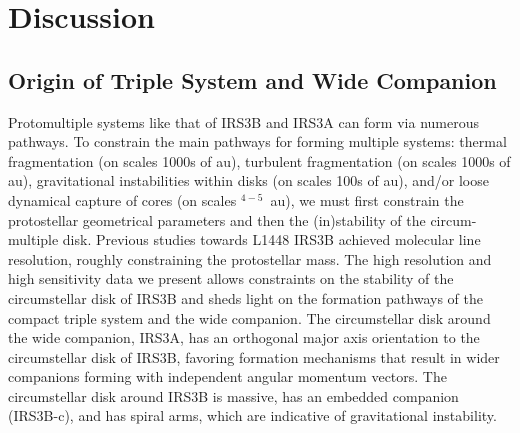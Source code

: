 \documentclass[twocolumn, 12pt, trackchanges]{aastex63}
\begin{document}
\section{Discussion}\label{sec:discussion}

\subsection{Origin of Triple System and Wide Companion}\label{sec:origin}
Protomultiple systems like that of IRS3B and IRS3A can form via numerous pathways. To constrain the main pathways for forming multiple systems: thermal fragmentation (on scales \ab1000s of au), turbulent fragmentation (on scales \ab1000s of au), gravitational instabilities within disks (on scales \ab100s of au), and/or loose dynamical capture of cores (on scales $^{4-5}$~au), we must first constrain the protostellar geometrical parameters and then the (in)stability of the circum-multiple disk. Previous studies towards L1448 IRS3B \citep[see ][]{2016Natur.538..483T} achieved \space molecular line resolution, roughly constraining the protostellar mass. The high resolution and high sensitivity data we present allows constraints on the stability of the circumstellar disk of IRS3B and sheds light on the formation pathways of the compact triple system and the wide companion. The circumstellar disk around the wide companion, IRS3A, has an orthogonal major axis orientation to the circumstellar disk of IRS3B, favoring formation mechanisms that result in wider companions forming with independent angular momentum vectors. The circumstellar disk around IRS3B is massive, has an embedded companion (IRS3B-c), and has spiral arms, which are indicative of gravitational instability.

\end{document}

